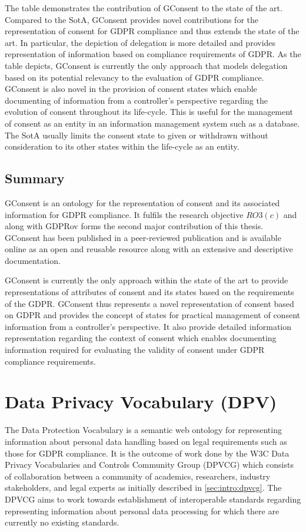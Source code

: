 The table demonstrates the contribution of GConsent to the state of the art. 
Compared to the SotA, GConsent provides novel contributions for the representation of consent for GDPR compliance and thus extends the state of the art.
In particular, the depiction of delegation is more detailed and provides representation of information based on compliance requirements of GDPR.
As the table depicts, GConsent is currently the only approach that models delegation based on its potential relevancy to the evaluation of GDPR compliance.
GConsent is also novel in the provision of consent states which enable documenting of information from a controller's perspective regarding the evolution of consent throughout its life-cycle. This is useful for the management of consent as an entity in an information management system such as a database.
The SotA usually limits the consent state to given or withdrawn without consideration to its other states within the life-cycle as an entity.

\subsection*{Summary}
GConsent is an ontology for the representation of consent and its associated information for GDPR compliance. It fulfils the research objective $RO3(c)$ and along with GDPRov forms the second major contribution of this thesis.
GConsent has been published in a peer-reviewed publication and is available online as an open and reusable resource along with an extensive and descriptive documentation.

GConsent is currently the only approach within the state of the art to provide representations of attributes of consent and its states based on the requirements of the GDPR.
GConsent thus represents a novel representation of consent based on GDPR and provides the concept of states for practical management of consent information from a controller's perspective. It also provide detailed information representation regarding the context of consent which enables documenting information required for evaluating the validity of consent under GDPR compliance requirements.

\section{Data Privacy Vocabulary (DPV)}\label{sec:voc:DPV}
The Data Protection Vocabulary \cite{pandit_creating_2019} is a semantic web ontology for representing information about personal data handling based on legal requirements such as those for GDPR compliance.
It is the outcome of work done by the W3C Data Privacy Vocabularies and Controls Community Group (DPVCG) which consists of collaboration between a community of academics, researchers, industry stakeholders, and legal experts as initially described in \autoref{sec:intro:dpvcg}.
The DPVCG aims to work towards establishment of interoperable standards regarding representing information about personal data processing for which there are currently no existing standards.

